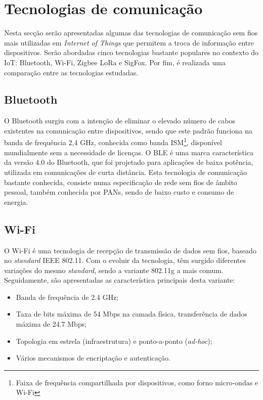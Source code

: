 \section{Tecnologias de comunicação}
\label{state-tecc}
Nesta secção serão apresentadas algumas das tecnologias de comunicação sem fios mais utilizadas em \textit{Internet of Things} que permitem a troca de informação entre dispositivos. Serão abordadas cinco tecnologias bastante populares no contexto do \ac{IoT}: Bluetooth, Wi-Fi, Zigbee LoRa e SigFox. Por fim, é realizada uma comparação entre as tecnologias estudadas. 



	




\subsection{Bluetooth}

O Bluetooth surgiu com a intenção de eliminar o elevado número de cabos existentes na comunicação entre dispositivos, sendo que este padrão funciona na banda de frequência 2,4 GHz, conhecida como banda \ac{ISM}\footnote{Faixa de frequência compartilhada por dispositivos, como forno micro-ondas e Wi-Fi}, disponível mundialmente sem a necessidade de licenças. O \ac{BLE} é uma marca característica da versão 4.0 do Bluetooth, que foi projetado para aplicações de baixa potência, utilizada em comunicações de curta distância. Esta tecnologia de comunicação bastante conhecida, consiste numa especificação de rede sem fios de âmbito pessoal, também conhecida por \ac{PANs}, sendo de baixo custo e consumo de energia\cite{Bruno2002}\cite{BluetoothTM2001}.






\subsection{Wi-Fi}


O Wi-Fi é uma tecnologia de recepção de transmissão de dados sem fios, baseado no \textit{standard} IEEE 802.11. Com o evoluir da tecnologia, têm surgido diferentes variações do mesmo \textit{standard}, sendo a variante 802.11g a mais comum. Seguidamente, são apresentadas as característica principais desta variante\cite{Paper2005}\cite{urlwifi}:


\begin{itemize}
	\item Banda de frequência de 2.4 GHz;
	\item Taxa de bits máxima de 54 Mbps na camada física, transferência de dados máxima de 24.7 Mbps;
	\item Topologia em estrela (infraestrutura) e ponto-a-ponto (\textit{ad-hoc});
	\item Vários mecanismos de encriptação e autenticação.
\end{itemize}



